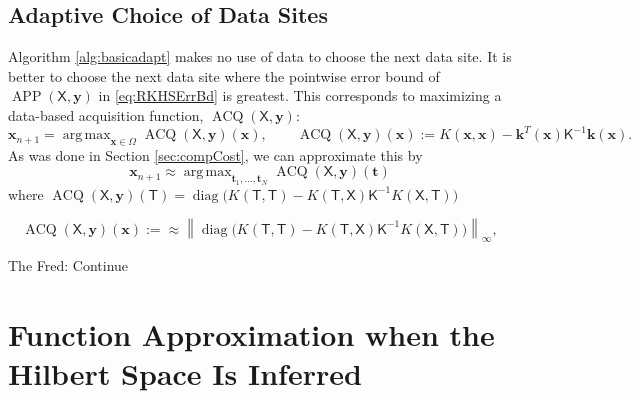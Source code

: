 \documentclass[]{mcom-l}
\theoremstyle{remark}
\DeclareMathOperator*{\argmax}{arg\,max}
\DeclareMathOperator{\ACQ}{ACQ}
\DeclareMathOperator{\diag}{diag}
\DeclareMathOperator{\APP}{APP}
\newcommand{\mK}{\mathsf{K}}
\newcommand{\mT}{\mathsf{T}}
\newcommand{\mX}{\mathsf{X}}
\newcommand{\bx}{{\boldsymbol{x}}}
\newcommand{\bk}{{\boldsymbol{k}}}
\newcommand{\by}{{\boldsymbol{y}}}
\newcommand{\bt}{{\boldsymbol{t}}}
\newcommand{\norm}[2][{}]{\ensuremath{\left \lVert #2 \right \rVert}_{#1}}
\newcommand{\FredNote}[1]{{\color{blue}Fred: #1}}
\begin{document}
\subsection{Adaptive Choice of Data Sites }  \label{sec:adaptSites}

Algorithm \ref{alg:basicadapt} makes no use of data to choose the next data site.  It is better to choose the next data site where the pointwise error bound of $\APP(\mX,\by)$ in \eqref{eq:RKHSErrBd} is greatest.  This corresponds to maximizing a data-based acquisition function, $\ACQ(\mX,\by)$:
\begin{equation} \label{eq:nextsample}
\bx_{n+1} = \argmax_{\bx \in \Omega} \ACQ(\mX,\by)(\bx), \qquad \ACQ(\mX,\by)(\bx) := K(\bx,\bx) - \bk^T(\bx) \mK^{-1} \bk(\bx).
\end{equation}
As was done in Section \ref{sec:compCost}, we can approximate this by
\begin{equation} \label{eq:nextsampleAPPX}
\bx_{n+1} \approx \argmax_{\bt_1, \ldots, \bt_N} \ACQ(\mX,\by)(\bt)
\end{equation}
where $\ACQ(\mX,\by)(\mT) = \diag\bigl(K(\mT,\mT) - K(\mT,\mX) \mK^{-1} K(\mX,\mT) \bigr)$

\begin{equation} \label{eq:normappx}
\ACQ(\mX,\by)(\bx) :=  \approx  \norm[\infty]{\diag\bigl(K(\mT,\mT) - K(\mT,\mX) \mK^{-1} K(\mX,\mT) \bigr)},
\end{equation}

The \FredNote{Continue}



\section{Function Approximation when the Hilbert Space Is Inferred} \label{sec:adaptF}



\end{document}
